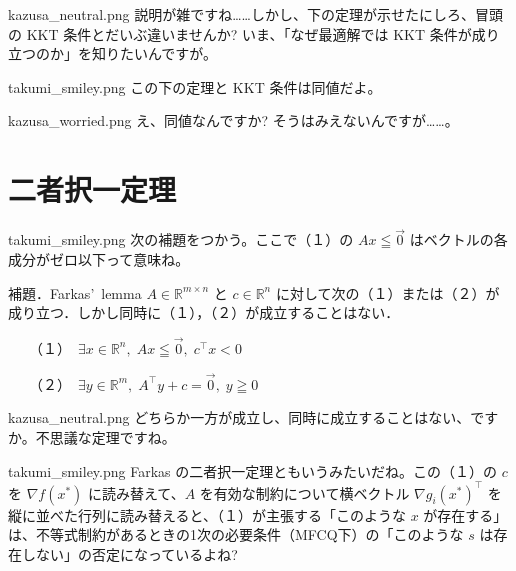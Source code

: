 \documentclass[b5paper,xelatex,ja=standard,10pt]{bxjsarticle}
\begin{document}
\begin{SERIFU}[colback=PaleIris, colbacktitle=PaleIris2]{kazusa_neutral.png}
説明が雑ですね……しかし、下の定理が示せたにしろ、冒頭の KKT 条件とだいぶ違いませんか? いま、「なぜ最適解では KKT 条件が成り立つのか」を知りたいんですが。
\end{SERIFU}

\begin{SERIFU}[colback=PaleGold, colbacktitle=PaleGold2]{takumi_smiley.png}
この下の定理と KKT 条件は同値だよ。
\end{SERIFU}

\begin{SERIFU}[colback=PaleIris, colbacktitle=PaleIris2]{kazusa_worried.png}
え、同値なんですか? そうはみえないんですが……。
\end{SERIFU}

\renewcommand*{\mysectiontitle}{二者択一定理}
\section*{\mysectiontitle}
\addcontentsline{toc}{section}{\mysectiontitle}
\vspace{3pt}

\begin{SERIFU}[colback=PaleGold, colbacktitle=PaleGold2]{takumi_smiley.png}
次の補題をつかう。ここで（１）の $Ax \leqq \vec{0}$ はベクトルの各成分がゼロ以下って意味ね。
\end{SERIFU}

\begin{PROP}[colback=White]{補題．Farkas’\, lemma}
$A \in \mathbb{R}^{m \times n}$ と $c \in \mathbb{R}^n$ に対して次の（１）または（２）が成り立つ．しかし同時に（１），（２）が成立することはない．

　　（１）　$\exists x \in \mathbb{R}^n, \; Ax \leqq \vec{0}, \; c^\top x < 0$

　　（２）　$\exists y \in \mathbb{R}^m, \; A^\top y + c = \vec{0}, \; y \geqq 0$
\end{PROP}

\begin{SERIFU}[colback=PaleIris, colbacktitle=PaleIris2]{kazusa_neutral.png}
どちらか一方が成立し、同時に成立することはない、ですか。不思議な定理ですね。
\end{SERIFU}

\begin{SERIFU}[colback=PaleGold, colbacktitle=PaleGold2]{takumi_smiley.png}
Farkas の二者択一定理ともいうみたいだね。この（１）の $c$ を $\nabla f(x^\ast)$ に読み替えて、$A$ を有効な制約について横ベクトル $\nabla g_i(x^\ast)^\top$ を縦に並べた行列に読み替えると、（１）が主張する「このような $x$ が存在する」は、不等式制約があるときの1次の必要条件（MFCQ下）の「このような $s$ は存在しない」の否定になっているよね?
\end{SERIFU}
\end{document}
